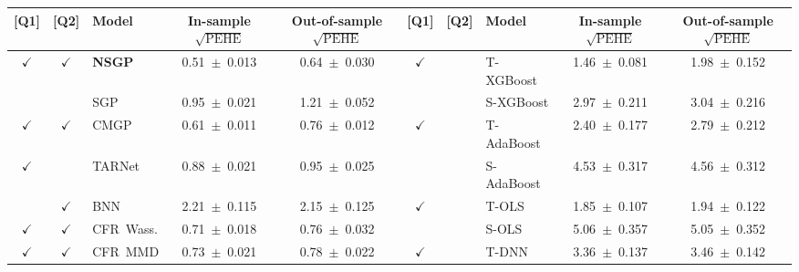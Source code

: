 \documentclass [PhD] {uclathes}
\begin{document}
\begin{table}[t]
\centering
\begin{tabular}{|cc|l||c|c|cc|l||c|c|}
\hline
\textbf{\tiny [Q1]} & \textbf{\tiny [Q2]} & \textbf{\tiny Model} & \textbf{\tiny In-sample $\sqrt{\mbox{PEHE}}$} & \textbf{\tiny Out-of-sample $\sqrt{\mbox{PEHE}}$} & \textbf{\tiny [Q1]} & \textbf{\tiny [Q2]} & \textbf{\tiny Model} & \textbf{\tiny In-sample $\sqrt{\mbox{PEHE}}$} & \textbf{\tiny Out-of-sample $\sqrt{\mbox{PEHE}}$} \\ \hline \hline
\mbox{\footnotesize $\boldsymbol{\checkmark}$} & \mbox{\footnotesize $\boldsymbol{\checkmark}$} & \mbox{\tiny \textbf{NSGP}} & \mbox{\tiny 0.51 $\pm$ 0.013} & \mbox{\tiny 0.64 $\pm$ 0.030} & \mbox{\footnotesize $\boldsymbol{\checkmark}$} & & \mbox{\tiny T-XGBoost} & \mbox{\tiny 1.46 $\pm$ 0.081} & \mbox{\tiny 1.98 $\pm$ 0.152} \\
& & \mbox{\tiny SGP} & \mbox{\tiny 0.95 $\pm$ 0.021} & \mbox{\tiny 1.21 $\pm$ 0.052} & & & \mbox{\tiny S-XGBoost} & \mbox{\tiny 2.97 $\pm$ 0.211} & \mbox{\tiny 3.04 $\pm$ 0.216} \\
\mbox{\footnotesize $\boldsymbol{\checkmark}$} & \mbox{\footnotesize $\boldsymbol{\checkmark}$} & \mbox{\tiny CMGP} & \mbox{\tiny 0.61 $\pm$ 0.011} & \mbox{\tiny 0.76 $\pm$ 0.012} & \mbox{\footnotesize $\boldsymbol{\checkmark}$} & & \mbox{\tiny T-AdaBoost} & \mbox{\tiny 2.40 $\pm$ 0.177} & \mbox{\tiny 2.79 $\pm$ 0.212} \\
\mbox{\footnotesize $\boldsymbol{\checkmark}$} & & \mbox{\tiny TARNet} & \mbox{\tiny 0.88 $\pm$ 0.021} & \mbox{\tiny 0.95 $\pm$ 0.025} & & & \mbox{\tiny S-AdaBoost} & \mbox{\tiny 4.53 $\pm$ 0.317} & \mbox{\tiny 4.56 $\pm$ 0.312} \\
 & \mbox{\footnotesize $\boldsymbol{\checkmark}$} & \mbox{\tiny BNN} & \mbox{\tiny 2.21 $\pm$ 0.115} & \mbox{\tiny 2.15 $\pm$ 0.125} & \mbox{\footnotesize $\boldsymbol{\checkmark}$} & & \mbox{\tiny T-OLS} & \mbox{\tiny 1.85 $\pm$ 0.107} & \mbox{\tiny 1.94 $\pm$ 0.122} \\
\mbox{\footnotesize $\boldsymbol{\checkmark}$} & \mbox{\footnotesize $\boldsymbol{\checkmark}$} & \mbox{\tiny CFR Wass.} & \mbox{\tiny 0.71 $\pm$ 0.018} & \mbox{\tiny 0.76 $\pm$ 0.032} & & & \mbox{\tiny S-OLS} & \mbox{\tiny 5.06 $\pm$ 0.357} & \mbox{\tiny 5.05 $\pm$ 0.352} \\
\mbox{\footnotesize $\boldsymbol{\checkmark}$} & \mbox{\footnotesize $\boldsymbol{\checkmark}$} & \mbox{\tiny CFR MMD} & \mbox{\tiny 0.73 $\pm$ 0.021} & \mbox{\tiny 0.78 $\pm$ 0.022} & \mbox{\footnotesize $\boldsymbol{\checkmark}$} & & \mbox{\tiny T-DNN} & \mbox{\tiny 3.36 $\pm$ 0.137} & \mbox{\tiny 3.46 $\pm$ 0.142} \\

\end{tabular}
\end{table}
\end{document}
